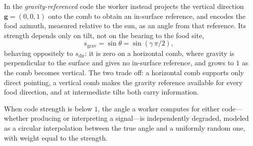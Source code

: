 \documentclass[11pt]{article}
\begin{document}
In the \emph{gravity-referenced} code the worker instead projects the vertical
direction $\mathbf{g} = (0,0,1)$ onto the comb to obtain an in-surface reference,
and encodes the food azimuth, measured relative to the sun, as an angle from that
reference. Its strength depends only on tilt, not on the bearing to the food site,
\begin{equation}
  s_{\mathrm{grav}} = \sin\theta = \sin(\gamma\,\pi/2),
\end{equation}
behaving oppositely to $s_{\mathrm{dir}}$: it is zero on a horizontal comb, where
gravity is perpendicular to the surface and gives no in-surface reference, and
grows to $1$ as the comb becomes vertical. The two trade off: a horizontal comb
supports only direct pointing, a vertical comb makes the gravity reference
available for every food direction, and at intermediate tilts both carry
information.

When code strength is below $1$, the angle a worker computes for either
code---whether producing or interpreting a signal---is independently degraded,
modeled as a circular interpolation between the true angle and a uniformly
random one, with weight equal to the strength.
\end{document}
